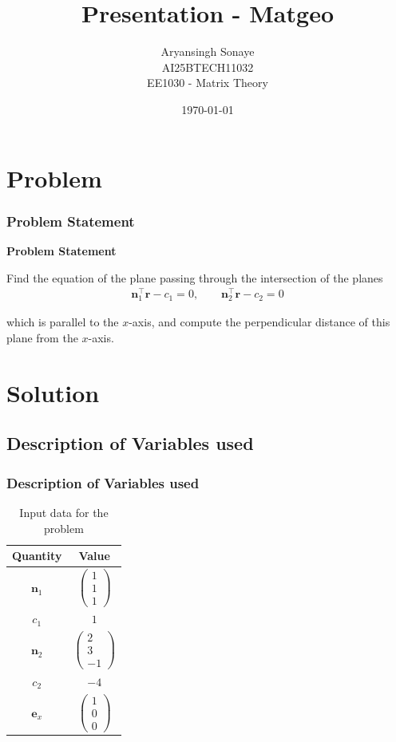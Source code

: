 \documentclass{beamer}
\title{Presentation - Matgeo}
\author{Aryansingh Sonaye \\
AI25BTECH11032 \\
EE1030 - Matrix Theory}
\date{\today}
\theoremstyle{remark}
\newcommand{\myvec}[1]{\ensuremath{\begin{pmatrix}#1\end{pmatrix}}}
\let\vec\mathbf
\numberwithin{equation}{section}
\begin{document}
\begin{frame}
\titlepage
\end{frame}

\section{Problem}
\begin{frame}
\frametitle{Problem Statement}
\textbf{Problem Statement}

Find the equation of the plane passing through the intersection of the planes 
\begin{align}
\vec{n}_1^\top \vec{r} - c_1 = 0, 
\qquad
\vec{n}_2^\top \vec{r} - c_2 = 0
\end{align}

which is parallel to the $x$-axis, and compute the perpendicular distance of this plane from the $x$-axis.

\end{frame}

\section{Solution}
\subsection{Description of Variables used}
\begin{frame}
\frametitle{Description of Variables used}
\begin{table}[H]
\centering
\begin{tabular}{|c|c|}
\hline
\textbf{Quantity} & \textbf{Value} \\
\hline
$\vec{n}_1$ & $\myvec{1\\1\\1}$ \\
\hline
$c_1$ & $1$ \\
\hline
$\vec{n}_2$ & $\myvec{2\\3\\-1}$ \\
\hline
$c_2$ & $-4$ \\
\hline
$\vec{e}_x$ & $\myvec{1\\0\\0}$ \\
\hline
\end{tabular}
\caption{Input data for the problem}
\label{}
\end{table}


\end{frame}
\end{document}

